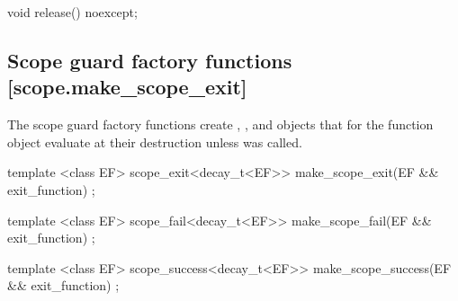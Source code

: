 \documentclass[ebook,11pt,article]{memoir}
\begin{document}
\begin{itemdecl}
void release() noexcept;
\end{itemdecl}

\begin{itemdescr}
\pnum
\end{itemdescr}


\subsection {Scope guard factory functions [scope.make_scope_exit]}
\pnum
The scope guard factory functions create , , and  objects that for the function object  evaluate  at their destruction unless  was called.

\begin{itemdecl}
template <class EF>
scope_exit<decay_t<EF>> make_scope_exit(EF && exit_function) ;
\end{itemdecl}

\begin{itemdescr}
\pnum
\returns {}
\end{itemdescr}

\begin{itemdecl}
template <class EF>
scope_fail<decay_t<EF>> make_scope_fail(EF && exit_function) ;
\end{itemdecl}

\begin{itemdescr}
\pnum
\pnum
\returns {}
\end{itemdescr}

\begin{itemdecl}
template <class EF>
scope_success<decay_t<EF>> make_scope_success(EF && exit_function) ;
\end{itemdecl}

\begin{itemdescr}
\pnum
\pnum
\returns {}

\end{itemdescr}


\newpage
\end{document}
